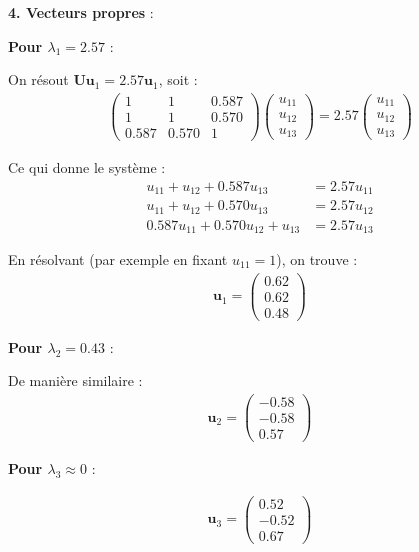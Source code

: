 \documentclass[11pt,a4paper]{article}
\begin{document}
\textbf{4. Vecteurs propres} :

\textbf{Pour $\lambda_1 = 2.57$} :

On résout $\mathbf{U}\mathbf{u}_1 = 2.57\mathbf{u}_1$, soit :
\begin{align*}
\begin{pmatrix}
1 & 1 & 0.587 \\
1 & 1 & 0.570 \\
0.587 & 0.570 & 1
\end{pmatrix} \begin{pmatrix} u_{11} \\ u_{12} \\ u_{13} \end{pmatrix} = 2.57 \begin{pmatrix} u_{11} \\ u_{12} \\ u_{13} \end{pmatrix}
\end{align*}

Ce qui donne le système :
\begin{align*}
u_{11} + u_{12} + 0.587u_{13} &= 2.57u_{11} \\
u_{11} + u_{12} + 0.570u_{13} &= 2.57u_{12} \\
0.587u_{11} + 0.570u_{12} + u_{13} &= 2.57u_{13}
\end{align*}

En résolvant (par exemple en fixant $u_{11} = 1$), on trouve :
\begin{align*}
\mathbf{u}_1 = \begin{pmatrix} 0.62 \\ 0.62 \\ 0.48 \end{pmatrix}
\end{align*}

\textbf{Pour $\lambda_2 = 0.43$} :

De manière similaire :
\begin{align*}
\mathbf{u}_2 = \begin{pmatrix} -0.58 \\ -0.58 \\ 0.57 \end{pmatrix}
\end{align*}

\textbf{Pour $\lambda_3 \approx 0$} :

\begin{align*}
\mathbf{u}_3 = \begin{pmatrix} 0.52 \\ -0.52 \\ 0.67 \end{pmatrix}
\end{align*}
\end{document}
